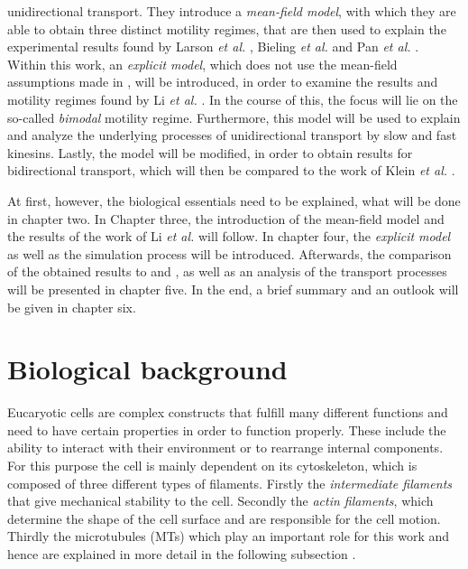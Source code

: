 unidirectional transport. They introduce a \textit{mean-field model}, with which they are able to obtain three distinct motility regimes, that are then used to explain the experimental results
found by Larson \textit{et al.} \cite{larson}, Bieling \textit{et al.} \cite{bieling} and Pan \textit{et al.} \cite{jcb174}. \\
Within this work, an \textit{explicit model}, which does not use the mean-field assumptions made in \cite{li}, will be introduced, in order to examine the results and motility regimes found by Li
\textit{et al.} \cite{li}. In the course of this, the focus will lie on the so-called \textit{bimodal} motility regime. Furthermore, this model will be used to explain and analyze the underlying
processes of unidirectional transport by slow and fast kinesins. Lastly, the model will be modified, in order to obtain results for bidirectional transport, which will then be compared to
the work of Klein \textit{et al.} \cite{sklein}.

At first, however, the biological essentials need to be explained, what will be done in chapter two. In Chapter three, the introduction of the mean-field model and the results of the
work of Li \textit{et al.} \cite{li} will follow. In chapter four, the \textit{explicit model} as well as the simulation process will be introduced. Afterwards, the comparison of the obtained results to
\cite{li} and \cite{sklein}, as well as an analysis of the transport processes will be presented in chapter five. In the end, a brief summary and an outlook will be given in chapter six.





\chapter{Biological background}\label{c.bio-background}
Eucaryotic cells are complex constructs that fulfill many different functions and need to have certain properties in order to function properly. These include the ability to interact with their
environment or to rearrange internal components. For this purpose the cell is mainly dependent on its cytoskeleton, which is composed of three different types of filaments. Firstly the 
\textit{intermediate filaments} that give mechanical stability to the cell. Secondly the \textit{actin filaments}, which determine the shape of the cell surface and are responsible for the cell
motion. Thirdly the microtubules (MTs) which play an important role for this work and hence are explained in more detail in the following subsection \cite{alberts}.

